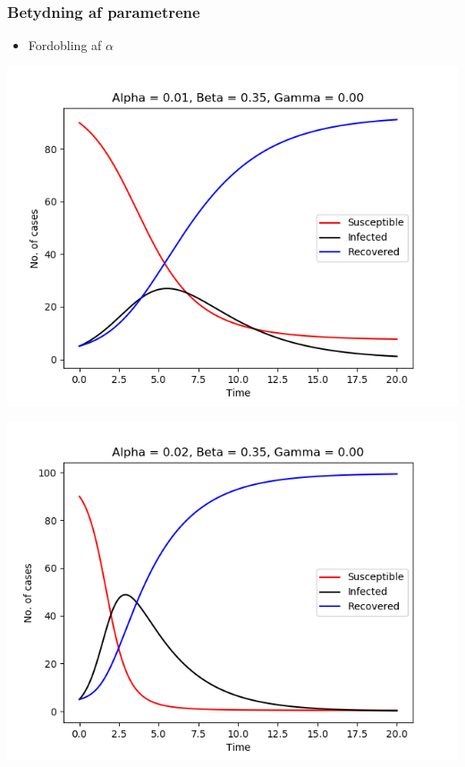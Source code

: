 \begin{frame}
\frametitle{Betydning af parametrene}
\begin{itemize}
\item Fordobling af $\alpha$
\end{itemize}

\begin{minipage}{0.49\textwidth}
\includegraphics[scale=0.3]{fig/img/t_a1_b35_g0.png}
\end{minipage}
%
\begin{minipage}{0.49\textwidth}
\includegraphics[scale=0.3]{fig/img/t_a2_b35_g0.png}
\end{minipage}
\end{frame}

